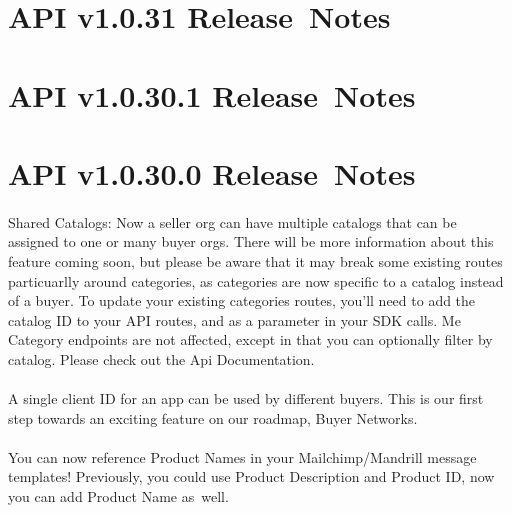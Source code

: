 \documentclass{memoir}%
\begin{document}
%
\section*{API v1.0.31 Release~Notes}%
\paragraph*{}%

%
\section*{API v1.0.30.1 Release~Notes}%
\paragraph*{}%

%
\section*{API v1.0.30.0 Release~Notes}%
\paragraph*{}%

%
\paragraph*{}%
Shared Catalogs: Now a seller org can have multiple catalogs that can be assigned to one or many buyer orgs. There will be more information about this feature coming soon, but please be aware that it may break some existing routes particuarlly around categories, as categories are now specific to a catalog instead of a buyer. To update your existing categories routes, you’ll need to add the catalog ID to your API routes, and as a parameter in your SDK calls. Me Category endpoints are not affected, except in that you can optionally filter by catalog. Please check out the Api Documentation.

%
\paragraph*{}%
A single client ID for an app can be used by different buyers. This is our first step towards an exciting feature on our roadmap, Buyer Networks.

%
\paragraph*{}%
You can now reference Product Names in your Mailchimp/Mandrill message templates! Previously, you could use Product Description and Product ID, now you can add Product Name as~well. 
\end{document}
